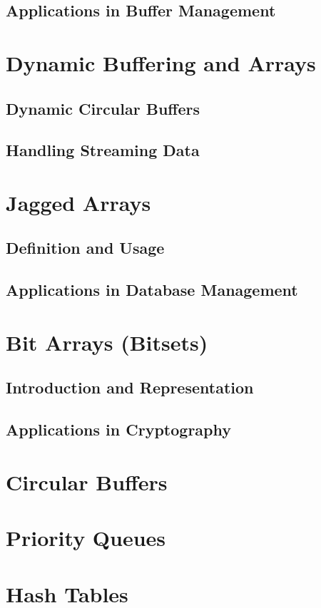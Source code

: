 \documentclass[12pt, oneside]{book}
\begin{document}
	\subsection{Applications in Buffer Management}
	
	\section{Dynamic Buffering and Arrays}
	\subsection{Dynamic Circular Buffers}
	\subsection{Handling Streaming Data}
	
	\section{Jagged Arrays}
	\subsection{Definition and Usage}
	\subsection{Applications in Database Management}
	
	\section{Bit Arrays (Bitsets)}
	\subsection{Introduction and Representation}
	\subsection{Applications in Cryptography}
	\section{Circular Buffers}
	\section{Priority Queues}
	\section{Hash Tables}
\end{document}
